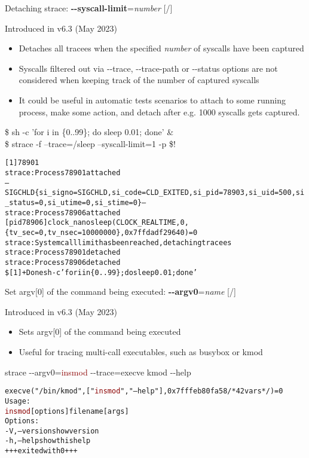 \documentclass[unicode,aspectratio=169,xcolor={table,dvipsnames,usernames}]{beamer}
\begin{document}
\begin{frame}[fragile]{Detaching strace: \textbf{-{}-syscall-limit}=\textit{number} \hfill [\insertframenumber/\inserttotalframenumber]}
\begin{block}{Introduced in v6.3 (May 2023)}
\begin{itemize}
\item Detaches all tracees when the specified \textit{number} of syscalls have been captured
\item Syscalls filtered out via -{}-trace, -{}-trace-path or -{}-status options are not considered when keeping track of the number of captured syscalls
\item It could be useful in automatic tests scenarios to attach to some running
process, make some action, and detach after e.g. 1000 syscalls gets captured.
\end{itemize}
\end{block}

\begin{block}{\$ sh -c 'for i in \{0..99\}; do sleep 0.01; done' \& \\ \$ strace -f --trace=/sleep --syscall-limit=1 -p \$!}
\scriptsize
\begin{alltt}
[1] 78901
strace: Process 78901 attached
--- SIGCHLD \{si_signo=SIGCHLD, si_code=CLD_EXITED, si_pid=78903, si_uid=500, si_status=0, si_utime=0, si_stime=0\} ---
strace: Process 78906 attached
[pid 78906] clock_nanosleep(CLOCK_REALTIME, 0, \{tv_sec=0, tv_nsec=10000000\}, 0x7ffdadf29640) = 0
strace: System call limit has been reached, detaching tracees
strace: Process 78901 detached
strace: Process 78906 detached
\$ [1]+  Done                    sh -c 'for i in \{0..99\}; do sleep 0.01; done'
\end{alltt}
\end{block}
\end{frame}

\begin{frame}[fragile]{Set argv[0] of the command being executed: \textbf{-{}-argv0}=\textit{name} \hfill [\insertframenumber/\inserttotalframenumber]}
\begin{block}{Introduced in v6.3 (May 2023)}
\begin{itemize}
\item Sets argv[0] of the command being executed
\item Useful for tracing multi-call executables, such as busybox or kmod
\end{itemize}
\end{block}
\begin{block}{strace -{}-argv0=\textcolor{darkred}{insmod} -{}-trace=execve kmod -{}-help}
\small
\begin{alltt}
	execve("/bin/kmod", ["\textcolor{darkred}{insmod}", "--help"], 0x7fffeb80fa58 /* 42 vars */) = 0
Usage:
	\textcolor{darkred}{insmod} [options] filename [args]
Options:
	-V, --version     show version
	-h, --help        show this help
+++ exited with 0 +++
\end{alltt}
\end{block}
\end{frame}
\end{document}
